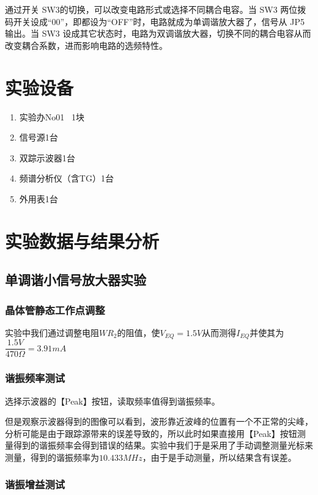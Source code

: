 \documentclass{../source/Experiment}
\begin{document}
    通过开关 SW3的切换，可以改变电路形式或选择不同耦合电容。当 SW3 两位拨码开关设成“00”，即都设为“OFF”时，电路就成为单调谐放大器了，信号从 JP5 输出。当 SW3 设成其它状态时，电路为双调谐放大器，切换不同的耦合电容从而改变耦合系数，进而影响电路的选频特性。

    \section{实验设备}
        \begin{enumerate}
            \item 实验办No01 \, 1块
            \item 信号源1台
            \item 双踪示波器1台
            \item 频谱分析仪（含TG）1台
            \item 外用表1台
        \end{enumerate}
        
    \section{实验数据与结果分析}
        \subsection{单调谐小信号放大器实验}
            \subsubsection{晶体管静态工作点调整}
            
            实验中我们通过调整电阻$WR_2$的阻值，使$V_{EQ} = 1.5V$从而测得$I_{EQ}$并使其为$\dfrac{1.5V}{470\Omega} = 3.91mA$
            
            \subsubsection{谐振频率测试}

            选择示波器的【Peak】按钮，读取频率值得到谐振频率。

            但是观察示波器得到的图像可以看到，波形靠近波峰的位置有一个不正常的尖峰，分析可能是由于跟踪源带来的误差导致的，所以此时如果直接用【Peak】按钮测量得到的谐振频率会得到错误的结果。实验中我们于是采用了手动调整测量光标来测量，得到的谐振频率为$10.433MHz$，由于是手动测量，所以结果含有误差。
            
            \subsubsection{谐振增益测试}
\end{document}
